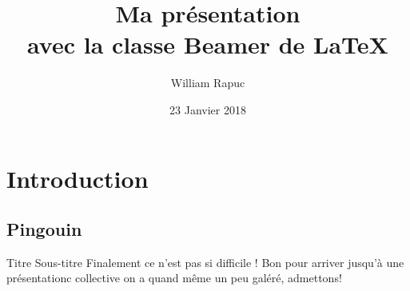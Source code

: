 \documentclass[usenames,dvipsnames, 12pt]{beamer}
\title{Ma présentation \\avec la classe Beamer de \LaTeX}
\author{William Rapuc}
\institute{EDYTEM}
\date{23 Janvier 2018}
\begin{document}
\section{Introduction}
\subsection{Pingouin}

 \begin{frame}
 \titlepage
 \end{frame}
 \begin{frame}{Titre }{Sous-titre}
  Finalement ce n'est pas si difficile ! Bon pour arriver jusqu'à une présentationc collective on a quand même un peu galéré, admettons!
  	\end{frame}
\end{document}
